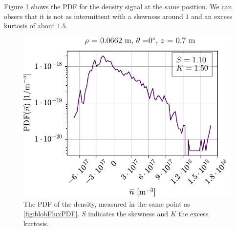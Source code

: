 %
Figure \cref{fig:blobDensPDF} shows the PDF for the density signal at the same position.
We can obsere that it is not as intermittent with a skewness around $1$ and an excess kurtosis of about $1.5$.
%
\begin{figure}[htb]
    \begin{center}
        \includegraphics{fig/results/blobs/blobDensPDF_B0_008Tweak}
    \end{center}
    \caption{
        The PDF of the density, measured in the same point as \cref{fig:blobFluxPDF}.
        $S$ indicates the skewness and $K$ the excess kurtosis.
    }
    \label{fig:blobDensPDF}
\end{figure}
%

